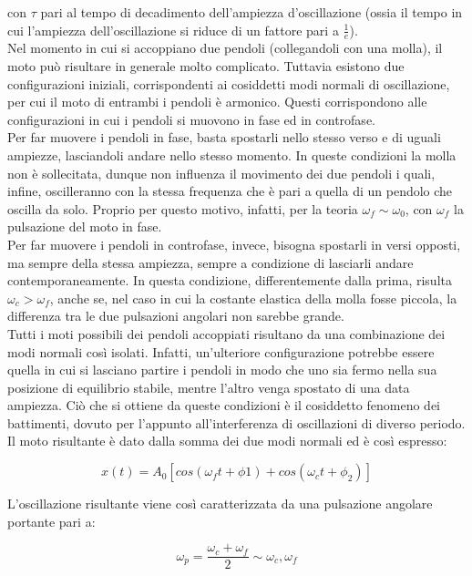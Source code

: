 \documentclass{article}
\begin{document}
con $\tau$ pari al tempo di decadimento dell'ampiezza d'oscillazione (ossia il tempo in cui l'ampiezza dell'oscillazione si riduce di un fattore pari a $\frac{1}{e}$).\\
Nel momento in cui si accoppiano due pendoli (collegandoli con una molla), il moto può risultare in generale molto complicato. Tuttavia esistono due configurazioni iniziali, corrispondenti ai cosiddetti modi normali di oscillazione, per cui il moto di entrambi i pendoli è armonico. Questi corrispondono alle configurazioni in cui i pendoli si muovono in fase ed in controfase.\\
Per far muovere i pendoli in fase, basta spostarli nello stesso verso e di uguali ampiezze, lasciandoli andare nello stesso momento. In queste condizioni la molla non è sollecitata, dunque non influenza il movimento dei due pendoli i quali, infine, oscilleranno con la stessa frequenza che è pari a quella di un pendolo che oscilla da solo. Proprio per questo motivo, infatti, per la teoria $\omega_f \sim \omega_0$, con $\omega_f$ la pulsazione del moto in fase.\\
Per far muovere i pendoli in controfase, invece, bisogna spostarli in versi opposti, ma sempre della stessa ampiezza, sempre a condizione di lasciarli andare contemporaneamente. In questa condizione, differentemente dalla prima, risulta $\omega_c > \omega_f$, anche se, nel caso in cui la costante elastica della molla fosse piccola, la differenza tra le due pulsazioni angolari non sarebbe grande.\\
Tutti i moti possibili dei pendoli accoppiati risultano da una combinazione dei modi normali così isolati. Infatti, un'ulteriore configurazione potrebbe essere quella in cui si lasciano partire i pendoli in modo che uno sia fermo nella sua posizione di equilibrio stabile, mentre l'altro venga spostato di una data ampiezza. Ciò che si ottiene da queste condizioni è il cosiddetto fenomeno dei battimenti, dovuto per l'appunto all'interferenza di oscillazioni di diverso periodo. Il moto risultante è dato dalla somma dei due modi normali ed è così espresso:

\begin{equation}
    x(t) = A_0[cos(\omega_f t + \phi1) + cos(\omega_c t + \phi_2)]
\end{equation}

L'oscillazione risultante viene così caratterizzata da una pulsazione angolare portante pari a:

\begin{equation}
    \omega_p = \frac{\omega_c + \omega_f}{2} \sim \omega_c, \omega_f
\end{equation}
\end{document}
